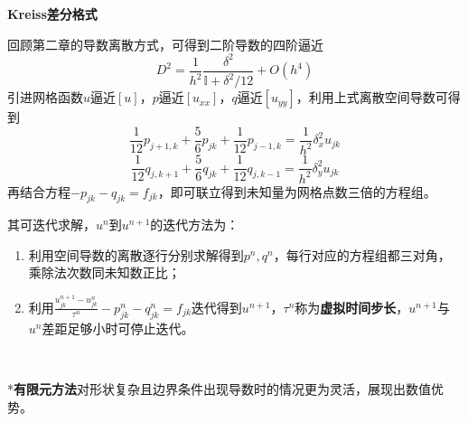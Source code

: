 \documentclass[a4paper,UTF8,fontset=windows]{ctexart}
\begin{document}
\textbf{Kreiss差分格式}

回顾第二章的导数离散方式，可得到二阶导数的四阶逼近
$$D^2=\frac{1}{h^2}\frac{\delta^2}{\mathbb{I}+\delta^2/12}+O(h^4)$$
引进网格函数$u$逼近$[u]$，$p$逼近$[u_{xx}]$，$q$逼近$[u_{yy}]$，利用上式离散空间导数可得到
$$\frac{1}{12}p_{j+1,k}+\frac{5}{6}p_{jk}+\frac{1}{12}p_{j-1,k}=\frac{1}{h^2}\delta_x^2u_{jk}$$
$$\frac{1}{12}q_{j,k+1}+\frac{5}{6}q_{jk}+\frac{1}{12}q_{j,k-1}=\frac{1}{h^2}\delta_y^2u_{jk}$$
再结合方程$-p_{jk}-q_{jk}=f_{jk}$，即可联立得到未知量为网格点数三倍的方程组。

其可迭代求解，$u^n$到$u^{n+1}$的迭代方法为：
\begin{enumerate}
    \item 利用空间导数的离散逐行分别求解得到$p^n,q^n$，每行对应的方程组都三对角，乘除法次数同未知数正比；
    \item 利用$\frac{u_{jk}^{n+1}-u_{jk}^n}{\tau^n}-p_{jk}^n-q_{jk}^n=f_{jk}$迭代得到$u^{n+1}$，$\tau^n$称为\textbf{虚拟时间步长}，$u^{n+1}$与$u^n$差距足够小时可停止迭代。
\end{enumerate}

\

*\textbf{有限元方法}对形状复杂且边界条件出现导数时的情况更为灵活，展现出数值优势。
\end{document}
